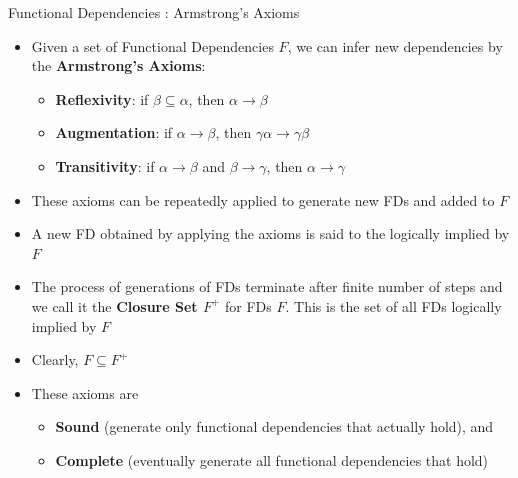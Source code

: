\documentclass[aspectratio=169, xcolor=dvipsnames]{beamer}
\begin{document}
\begin{frame}{Functional Dependencies : Armstrong's Axioms}
    \begin{itemize}[<+->]
        \item Given a set of Functional Dependencies $F$, we can infer new dependencies by the \textbf{Armstrong's Axioms}:
        \begin{itemize}
            \item[$\triangleright$] \textbf{Reflexivity}: if $\beta \subseteq \alpha$, then $\alpha \rightarrow \beta$
            \item[$\triangleright$] \textbf{Augmentation}: if $\alpha \rightarrow \beta$, then $\gamma\alpha \rightarrow \gamma\beta$
            \item[$\triangleright$] \textbf{Transitivity}: if $\alpha \rightarrow \beta$ and $\beta \rightarrow \gamma$, then $\alpha \rightarrow \gamma$
        \end{itemize}
        \item These axioms can be repeatedly applied to generate new FDs and added to $F$
        \item A new FD obtained by applying the axioms is said to the logically implied by $F$
        \item The process of generations of FDs terminate after finite number of steps and we call it the \textbf{Closure Set $F^+$} for FDs $F$. This is the set of all FDs logically implied by $F$
        \item Clearly, $F \subseteq F^+$
        \item These axioms are
        \begin{itemize}
            \item[$\triangleright$] \textbf{Sound} (generate only functional dependencies that actually hold), and
            \item[$\triangleright$] \textbf{Complete} (eventually generate all functional dependencies that hold)
        \end{itemize}
    \end{itemize}
\end{frame}
\end{document}
